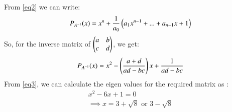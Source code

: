 \documentclass[journal,12pt,twocolumn]{IEEEtran}
\begin{document}
From \eqref{eq2} we can write:
\begin{align}
    P_{A^{-1}}(x) = x^n + \frac{1}{a_0}\left(a_1x^{n-1}+...+a_{n-1}x + 1\right) \nonumber
\end{align}
So, for the inverse matrix of $\begin{pmatrix}a & b\\c & d\end{pmatrix}$, we get:
\begin{align}
      P_{A^{-1}}(x) = x^2 - \left(\frac{a+d}{ad-bc}\right)x + \frac{1}{ad-bc} \label{eq3} 
\end{align}
From \eqref{eq3}, we can calculate the eigen values for the required matrix as :
\begin{align}
    x^2 - 6x + 1 = 0 \\
    \implies x = 3+\sqrt{8} \text{ or } 3-\sqrt{8}
\end{align}
\end{document}
